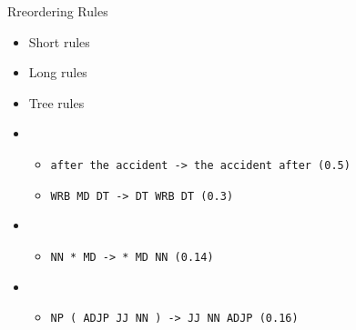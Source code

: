 \documentclass[18pt]{beamer}
\begin{document}
\begin{frame}{Rreordering Rules}
\begin{itemize}[<+-| alert@+>]
\item Short rules
\item Long rules
\item Tree rules
\end{itemize}
\begin{overprint}
\begin{itemize}
\item[] 
\begin{itemize}
\item[] \texttt{after the accident -> the accident after (0.5)}\bigskip \\
\item[] \texttt{WRB MD DT -> DT WRB DT (0.3)}
\end{itemize}
\end{itemize}
\begin{itemize}
\item[] 
\begin{itemize}
\item[] \texttt{NN * MD -> * MD NN (0.14)}
\end{itemize}
\end{itemize}
\begin{itemize}
\item[] 
\begin{itemize}
\item[] \texttt{NP ( ADJP JJ NN ) -> JJ NN ADJP (0.16)}
\end{itemize}
\end{itemize}
\begin{figure}
\centering

\end{figure}
\end{overprint}
\end{frame}
\end{document}
